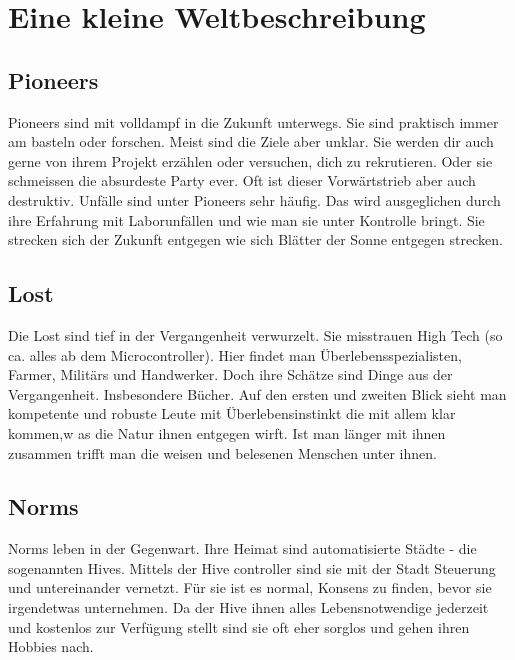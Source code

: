 
\chapter{Eine kleine Weltbeschreibung}


\section{Pioneers}
\label{sec:Pioneers}

Pioneers sind mit volldampf in die Zukunft unterwegs. Sie sind praktisch immer am basteln oder forschen. Meist sind die Ziele aber unklar. Sie werden dir auch gerne von ihrem Projekt erzählen oder versuchen, dich zu rekrutieren. Oder sie schmeissen die absurdeste Party ever.
Oft ist dieser Vorwärtstrieb aber auch destruktiv. Unfälle sind unter Pioneers sehr häufig. Das wird ausgeglichen durch ihre Erfahrung mit Laborunfällen und wie man sie unter Kontrolle bringt.
Sie strecken sich der Zukunft entgegen wie sich Blätter der Sonne entgegen strecken.

\section{Lost}
\label{sec:Lost}

Die Lost sind tief in der Vergangenheit verwurzelt. Sie misstrauen High Tech (so ca. alles ab dem Microcontroller). Hier findet man Überlebensspezialisten, Farmer, Militärs und Handwerker. Doch ihre Schätze sind Dinge aus der Vergangenheit. Insbesondere Bücher.
Auf den ersten und zweiten Blick sieht man kompetente und robuste Leute mit Überlebensinstinkt die mit allem klar kommen,w as die Natur ihnen entgegen wirft. Ist man länger mit ihnen zusammen trifft man die weisen und belesenen Menschen unter ihnen.

\section{Norms}
\label{sec:Norms}

Norms leben in der Gegenwart. Ihre Heimat sind automatisierte Städte - die sogenannten Hives. Mittels der Hive controller sind sie mit der Stadt Steuerung und untereinander vernetzt. Für sie ist es normal, Konsens zu finden, bevor sie irgendetwas unternehmen. Da der Hive ihnen alles Lebensnotwendige jederzeit und kostenlos zur Verfügung stellt sind sie oft eher sorglos und gehen ihren Hobbies nach.

